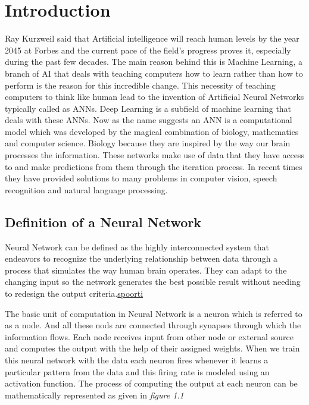\chapter{Introduction}\label{chap:introduction}
 
 Ray Kurzweil said that Artificial intelligence will reach human levels by the year 2045 at Forbes and the current pace of the field's progress proves it, especially during the past few decades. The main reason behind this is Machine Learning, a branch of AI that deals with teaching computers how to learn rather than how to perform is the reason for this incredible change. This necessity of teaching computers to think like human lead to the invention of Artificial Neural Networks typically called as ANNs. Deep Learning is a subfield of machine learning that deals with these ANNs. Now as the name suggests an ANN is a computational model which was developed by the magical combination of biology, mathematics and computer science. Biology because they are inspired by the way our brain processes the information. These networks make use of data that they have access to and make predictions from them through the iteration process. In recent times they have provided solutions to many problems in computer vision, speech recognition and natural language processing.
 \section{Definition of a Neural Network}
 \setlength{\parindent}{10ex}
 Neural Network can be defined as the highly interconnected system that endeavors to recognize the underlying relationship between data through a process that simulates the way human brain operates. They can adapt to the changing input so the network generates the best possible result without needing to redesign the output criteria.\underline{spoorti} %
 
 The basic unit of computation in Neural Network is a neuron which is referred to as a node. And all these nods are connected through synapses through which the information flows. Each node receives input from other node or external source and computes the output with the help of their assigned weights. When we train this neural network with the data each neuron fires whenever it learns a particular pattern from the data and this firing rate is modeled using an activation function. The process of computing the output at each neuron can be mathematically represented as given in \textit{figure 1.1}


